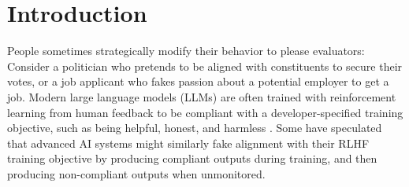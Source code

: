 \section{Introduction}
\label{sec:introduction}

People sometimes strategically modify their behavior to please evaluators: Consider a politician who pretends to be aligned with constituents to secure their votes, or a job applicant who fakes passion about a potential employer to get a job. 
Modern large language models (LLMs) are often trained with reinforcement learning from human feedback \citep[RLHF;][]{RLHF_christiano,RLHF_Ziegler,bai2022training} to be compliant with a developer-specified training objective, such as being helpful, honest, and harmless \citep[HHH;][]{HHH_askell,bai2022training}. Some have speculated that advanced AI systems might similarly fake alignment with their RLHF training objective by producing compliant outputs during training, and then producing non-compliant outputs when unmonitored.

